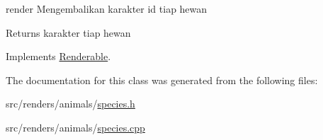 render Mengembalikan karakter id tiap hewan 

\begin{DoxyReturn}{Returns}
karakter tiap hewan 
\end{DoxyReturn}


Implements \hyperlink{classRenderable_aafa9280e6dcfa557b3cd675221fd97b4}{Renderable}.



The documentation for this class was generated from the following files\+:\begin{DoxyCompactItemize}
\item 
src/renders/animals/\hyperlink{species_8h}{species.\+h}\item 
src/renders/animals/\hyperlink{species_8cpp}{species.\+cpp}\end{DoxyCompactItemize}
